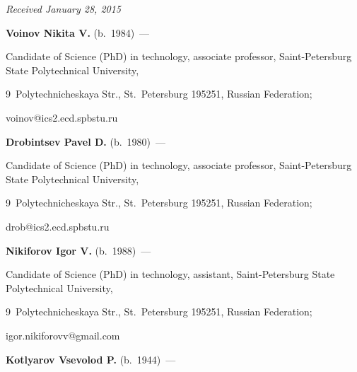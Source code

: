 \hfill{\small\textit{Received January 28, 2015}}





\Contr





\noindent


\textbf{Voinov Nikita V.} (b.\ 1984)~---


Candidate of Science (PhD) in technology, associate professor, Saint-Petersburg State Polytechnical University,


9~Polytechnicheskaya Str.,  St.\ Petersburg 195251, Russian Federation;


 voinov@ics2.ecd.spbstu.ru





\vspace*{3pt}





\noindent


\textbf{Drobintsev Pavel D.} (b.\ 1980)~---


Candidate of Science (PhD) in technology, associate professor, Saint-Petersburg State Polytechnical University,


9~Polytechnicheskaya Str.,  St.\ Petersburg 195251, Russian Federation;


drob@ics2.ecd.spbstu.ru





\vspace*{3pt}





\noindent


\textbf{Nikiforov Igor V.} (b.\ 1988)~---


   Candidate of Science  (PhD) in technology, assistant, Saint-Petersburg State Polytechnical University,


9~Polytechnicheskaya Str.,  St.\ Petersburg 195251, Russian Federation;


igor.nikiforovv@gmail.com





\vspace*{3pt}





\noindent


\textbf{Kotlyarov Vsevolod P.} (b.\ 1944)~---


